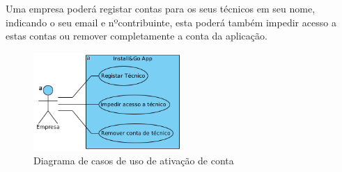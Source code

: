 Uma empresa poderá registar contas para os seus técnicos em seu nome, indicando o seu email e nºcontribuinte,
esta poderá também impedir acesso a estas contas ou remover completamente a conta da aplicação.

\begin{figure}[htb]
    \centering
    \includegraphics[width=0.5\textwidth]{images/diagramas/casos_de_uso/use_case_rec_humanos.png}
    \caption{Diagrama de casos de uso de ativação de conta}
    \label{fig:16}
\end{figure}